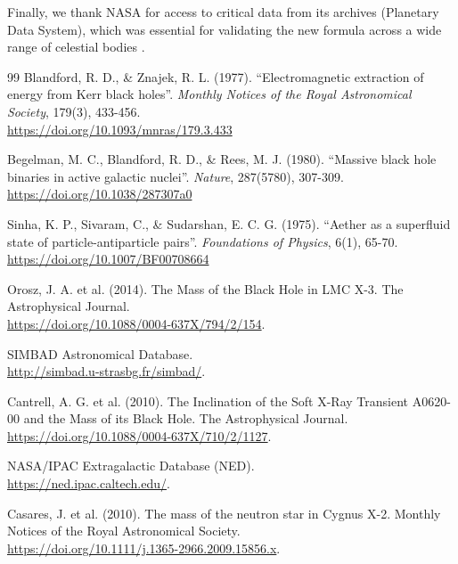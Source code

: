 \documentclass[11pt, a4paper]{article}
\begin{document}
Finally, we thank NASA for access to critical data from its archives (Planetary Data System), which was essential for validating the new formula across a wide range of celestial bodies \cite{nasa2024}.

\clearpage
\begin{thebibliography}{99}
  Blandford, R. D., \& Znajek, R. L. (1977). ``Electromagnetic extraction of energy from Kerr black holes''. \textit{Monthly Notices of the Royal Astronomical Society}, 179(3), 433-456. \\ \url{https://doi.org/10.1093/mnras/179.3.433}

  Begelman, M. C., Blandford, R. D., \& Rees, M. J. (1980). ``Massive black hole binaries in active galactic nuclei''. \textit{Nature}, 287(5780), 307-309. \\ \url{https://doi.org/10.1038/287307a0}

  Sinha, K. P., Sivaram, C., \& Sudarshan, E. C. G. (1975). ``Aether as a superfluid state of particle-antiparticle pairs''. \textit{Foundations of Physics}, 6(1), 65-70. \\ \url{https://doi.org/10.1007/BF00708664}

  Orosz, J. A. et al. (2014). The Mass of the Black Hole in LMC X-3. The Astrophysical Journal. \\ \url{https://doi.org/10.1088/0004-637X/794/2/154}.

  SIMBAD Astronomical Database. \\ \url{http://simbad.u-strasbg.fr/simbad/}.

  Cantrell, A. G. et al. (2010). The Inclination of the Soft X-Ray Transient A0620-00 and the Mass of its Black Hole. The Astrophysical Journal. \\ \url{https://doi.org/10.1088/0004-637X/710/2/1127}.

  NASA/IPAC Extragalactic Database (NED). \\ \url{https://ned.ipac.caltech.edu/}.

  Casares, J. et al. (2010). The mass of the neutron star in Cygnus X-2. Monthly Notices of the Royal Astronomical Society. \\ \url{https://doi.org/10.1111/j.1365-2966.2009.15856.x}.


\end{thebibliography}
\end{document}
